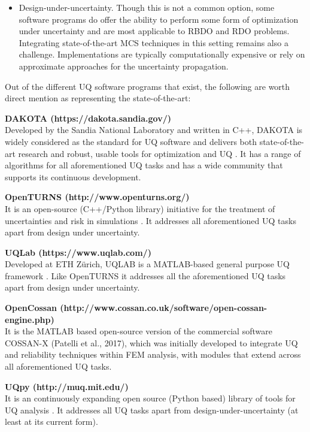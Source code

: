 \begin{itemize}
    \item Design-under-uncertainty. Though this is not a common option, some software programs do offer the ability to perform some form of optimization under uncertainty and are most applicable to RBDO and RDO problems. Integrating state-of-the-art MCS techniques in this setting remains also a challenge. Implementations are typically computationally expensive or rely on approximate approaches for the uncertainty propagation.
\end{itemize}

\noindent Out of the different UQ software programs that exist, the following are worth direct mention as representing the state-of-the-art: 
\newline

\noindent\textbf{DAKOTA (https://dakota.sandia.gov/)} \\Developed by the Sandia National Laboratory and written in C++, DAKOTA is widely considered as the standard for UQ software and delivers both state-of-the-art research and robust, usable tools for optimization and UQ \citep{adams2009dakota}. It has a range of algorithms for all aforementioned UQ tasks and has a wide community that supports its continuous development. 
\newline

\noindent\textbf{OpenTURNS (http://www.openturns.org/)} \\It is an open-source (C++/Python library) initiative for the treatment of uncertainties and risk in simulations \citep{andrianov2007open}. It addresses all aforementioned UQ tasks apart from design under uncertainty. 
\newline

\noindent\textbf{UQLab (https://www.uqlab.com/)} \\Developed at ETH Zürich, UQLAB is a MATLAB-based general purpose UQ framework \citep{marelli2014uqlab}. Like OpenTURNS it addresses all the aforementioned UQ tasks apart from design under uncertainty. 
\newline

\noindent\textbf{OpenCossan (http://www.cossan.co.uk/software/open-cossan-engine.php)} \\It is the MATLAB based open-source version of the commercial software COSSAN-X (Patelli et al., 2017), which was initially developed to integrate UQ and reliability techniques within FEM analysis, with modules that extend across all aforementioned UQ tasks.

\noindent\textbf{UQpy  (http://muq.mit.edu/)} \\It is an continuously expanding open source (Python based) library of tools for UQ analysis \citep{olivier2020uqpy}. It addresses all UQ tasks apart from design-under-uncertainty (at least at its current form).

